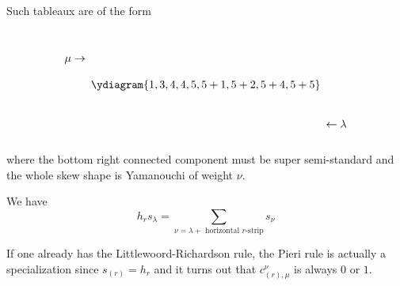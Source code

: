 \documentclass[11pt,leqno,oneside]{amsart}
\numberwithin{thm}{section}
\begin{document}
\begin{rmk}
  Such tableaux are of the form \[
    \begin{array}{c}
      \\ \\
      \mu \rightarrow \\
      \\ \\ \\ \\ \\ \\
    \end{array}
    \ydiagram{1,3,4,4,5,5+1,5+2,5+4,5+5}
    \begin{array}{c}
      \\ \\ \\ \\ \\ \\ \\
      \leftarrow \lambda \\
      \\
    \end{array}
  \]
  where the bottom right connected component must be super
  semi-standard and the whole skew shape is Yamanouchi of weight \(\nu\).
\end{rmk}
\begin{thm}
  \label{pieri-rule} We have \[
    h_r s_\lambda = \sum_{\nu = \lambda + \text{ horizontal
      }r\text{-strip}} s_\nu
  \]
\end{thm}
\begin{rmk}
  If one already has the Littlewoord-Richardson rule, the Pieri rule
  is actually a specialization since \(s_{(r)} = h_r\) and it turns
  out that \(c_{(r),\mu}^\nu\) is always \(0\) or \(1\).
\end{rmk}
\end{document}

